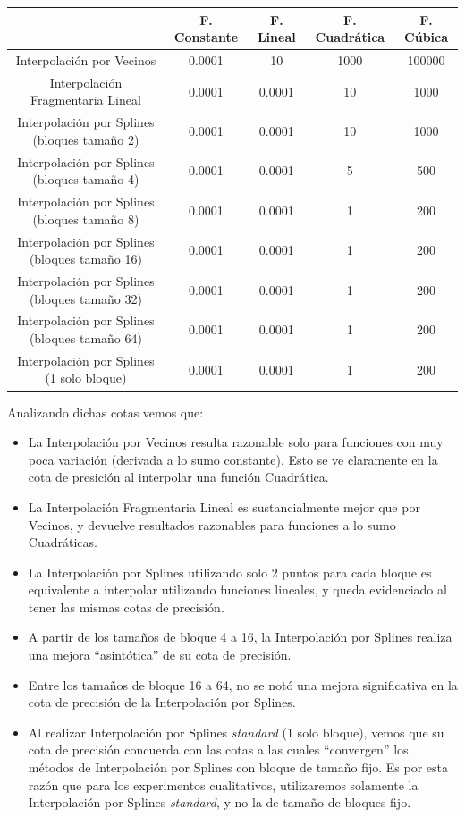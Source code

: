 \begin{table}[H]
    \begin{tabular}{| c | c | c | c | c |}
    \hline
    {} & F. Constante & F. Lineal & F. Cuadrática & F. Cúbica \\ \hline
    Interpolación por Vecinos & 0.0001 & 10 & 1000 & 100000 \\
    Interpolación Fragmentaria Lineal & 0.0001 & 0.0001 & 10 & 1000 \\
    Interpolación por Splines (bloques tamaño 2) & 0.0001 & 0.0001 & 10 & 1000 \\
    Interpolación por Splines (bloques tamaño 4) & 0.0001 & 0.0001 & 5 & 500 \\
    Interpolación por Splines (bloques tamaño 8) & 0.0001 & 0.0001 & 1 & 200 \\
    Interpolación por Splines (bloques tamaño 16) & 0.0001 & 0.0001 & 1 & 200 \\
    Interpolación por Splines (bloques tamaño 32) & 0.0001 & 0.0001 & 1 & 200 \\
    Interpolación por Splines (bloques tamaño 64) & 0.0001 & 0.0001 & 1 & 200 \\
    Interpolación por Splines (1 solo bloque) & 0.0001 & 0.0001 & 1 & 200 \\
    \hline
    \end{tabular}
\end{table}

Analizando dichas cotas vemos que:
\begin{itemize}
    \item La Interpolación por Vecinos resulta razonable solo para funciones con muy
        poca variación (derivada a lo sumo constante). Esto se ve claramente en la
        cota de presición al interpolar una función Cuadrática.
    \item La Interpolación Fragmentaria Lineal es sustancialmente mejor que por Vecinos,
        y devuelve resultados razonables para funciones a lo sumo Cuadráticas.
    \item La Interpolación por Splines utilizando solo 2 puntos para cada bloque es
        equivalente a interpolar utilizando funciones lineales, y queda evidenciado al
        tener las mismas cotas de precisión.
    \item A partir de los tamaños de bloque 4 a 16, la Interpolación por Splines realiza
        una mejora ``asintótica'' de su cota de precisión.
    \item Entre los tamaños de bloque 16 a 64, no se notó una mejora significativa en la cota
        de precisión de la Interpolación por Splines.
    \item Al realizar Interpolación por Splines \textit{standard} (1 solo bloque),
        vemos que su cota de precisión concuerda con las cotas a las cuales ``convergen''
        los métodos de Interpolación por Splines con bloque de tamaño fijo. Es por esta razón
        que para los experimentos cualitativos, utilizaremos solamente la Interpolación
        por Splines \textit{standard}, y no la de tamaño de bloques fijo.
\end{itemize}

